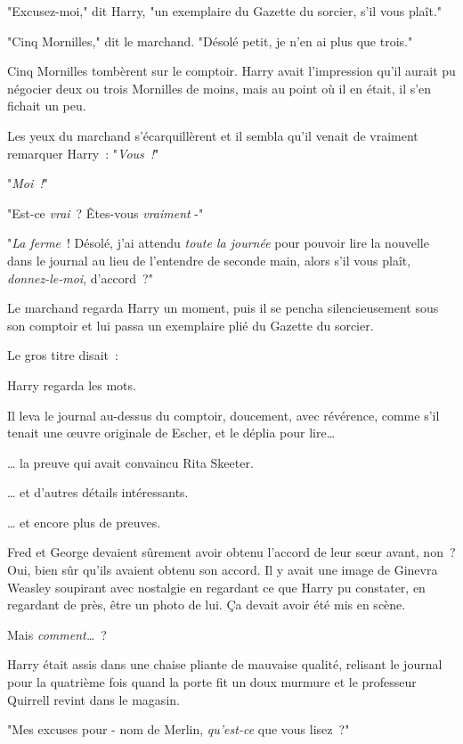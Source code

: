 "Excusez-moi," dit Harry, "un exemplaire du Gazette du sorcier, s'il vous plaît."

"Cinq Mornilles," dit le marchand. "Désolé petit, je n'en ai plus que trois."

Cinq Mornilles tombèrent sur le comptoir. Harry avait l'impression qu'il aurait pu négocier deux ou trois Mornilles de moins, mais au point où il en était, il s'en fichait un peu.

Les yeux du marchand s'écarquillèrent et il sembla qu'il venait de vraiment remarquer Harry~: "\emph{Vous~!}"

"\emph{Moi~!}"

"Est-ce \emph{vrai}~? Êtes-vous \emph{vraiment} -"

"\emph{La ferme}~! Désolé, j'ai attendu \emph{toute la journée} pour pouvoir lire la nouvelle dans le journal au lieu de l'entendre de seconde main, alors s'il vous plaît, \emph{donnez-le-moi}, d'accord~?"

Le marchand regarda Harry un moment, puis il se pencha silencieusement sous son comptoir et lui passa un exemplaire plié du Gazette du sorcier.

Le gros titre disait~:

Harry regarda les mots.

Il leva le journal au-dessus du comptoir, doucement, avec révérence, comme s'il tenait une œuvre originale de Escher, et le déplia pour lire…

… la preuve qui avait convaincu Rita Skeeter.

… et d'autres détails intéressants.

… et encore plus de preuves.

Fred et George devaient sûrement avoir obtenu l'accord de leur sœur avant, non~? Oui, bien sûr qu'ils avaient obtenu son accord. Il y avait une image de Ginevra Weasley soupirant avec nostalgie en regardant ce que Harry pu constater, en regardant de près, être un photo de lui. Ça devait avoir été mis en scène.

Mais \emph{comment…}~?

Harry était assis dans une chaise pliante de mauvaise qualité, relisant le journal pour la quatrième fois quand la porte fit un doux murmure et le professeur Quirrell revint dans le magasin.

"Mes excuses pour - nom de Merlin, \emph{qu'est-ce} que vous lisez~?"

